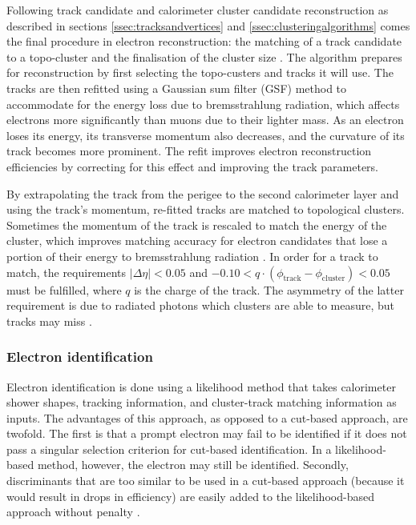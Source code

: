 Following track candidate and calorimeter cluster candidate reconstruction as described in sections \ref{ssec:tracksandvertices} and \ref{ssec:clusteringalgorithms} comes the final procedure in electron reconstruction: the matching of a track candidate to a topo-cluster and the finalisation of the cluster size \cite{ATLAS_electron_efficiency_2015-2016}. The algorithm prepares for reconstruction by first selecting the topo-custers and tracks it will use. The tracks are then refitted  using a Gaussian sum filter (GSF) method \cite{ATLAS-CONF-2012-047} to accommodate for the energy loss due to bremsstrahlung radiation, which affects electrons more significantly than muons due to their lighter mass. As an electron loses its energy, its transverse momentum also decreases, and the curvature of its track becomes more prominent. The refit improves electron reconstruction efficiencies by correcting for this effect and improving the track parameters.

By extrapolating the track from the perigee to the second calorimeter layer and using the track's momentum, re-fitted tracks are matched to topological clusters. Sometimes the momentum of the track is rescaled to match the energy of the cluster, which improves matching accuracy for electron candidates that lose a portion of their energy to bremsstrahlung radiation \cite{ATLAS_electron_efficiency_2015-2017}. In order for a track to match, the requirements $|\Delta\eta|<0.05$ and $-0.10<q\cdot(\phi_{\text{track}}-\phi_{\text{cluster}})<0.05$ must be fulfilled, where $q$ is the charge of the track. The asymmetry of the latter requirement is due to radiated photons which clusters are able to measure, but tracks may miss \cite{ATLAS_electron_efficiency_2015-2017}.

\subsubsection{Electron identification}

Electron identification is done using a likelihood method that takes calorimeter shower shapes, tracking information, and cluster-track matching information as inputs. The advantages of this approach, as opposed to a cut-based approach, are twofold. The first is that a prompt electron may fail to be identified if it does not pass a singular selection criterion for cut-based identification. In a likelihood-based method, however, the electron may still be identified. Secondly, discriminants that are too similar to be used in a cut-based approach (because it would result in drops in efficiency) are easily added to the likelihood-based approach without penalty \cite{ATLAS_electron_efficiency_2015-2016}.

